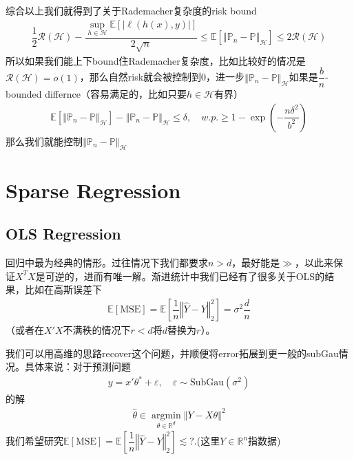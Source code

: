 \documentclass[11pt,a4paper]{ctexart}
\numberwithin{equation}{section}%
\begin{document}
综合以上我们就得到了关于Rademacher复杂度的risk bound
\begin{align*}
    \dfrac{ 1 }{ 2 } \mathcal{R}(\mathcal{H})-\dfrac{ \mathop{ \sup  }\limits_{h\in\mathcal{H}}\mathbb{E}\left[ \left\vert\ell(h(x),y) \right\vert  \right] }{ 2\sqrt{n} } \leq \mathbb{E}\left[ \left\Vert \mathbb{P}_n-\mathbb{P} \right\Vert _\mathcal{H} \right] \leq 2 \mathcal{R}(\mathcal{H}) 
\end{align*}
所以如果我们能上下bound住Rademacher复杂度，比如比较好的情况是$ \mathcal{R}(\mathcal{H}) = o(1)$，那么自然risk就会被控制到0，进一步$ \left\Vert \mathbb{P}_n-\mathbb{P} \right\Vert _\mathcal{H}  $如果是$ \dfrac{ b }{ n }  $-bounded differnce（容易满足的，比如只要$ h\in\mathcal{H} $有界）
\begin{align*}
    \mathbb{E}\left[ \left\Vert \mathbb{P}_n-\mathbb{P} \right\Vert _\mathcal{H} \right] -  \left\Vert \mathbb{P}_n-\mathbb{P} \right\Vert _\mathcal{H} \leq \delta ,\quad w.p. \geq 1-\exp\left( -\dfrac{ n \delta^2 }{ b^2 } \right)
\end{align*}
那么我们就能控制$ \left\Vert \mathbb{P}_n-\mathbb{P} \right\Vert _{\mathcal{H}} $







\section{Sparse Regression}

\subsection{OLS Regression}
回归中最为经典的情形。过往情况下我们都要求$ n>d $，最好能是$ \gg $，以此来保证$ X^TX $是可逆的，进而有唯一解。渐进统计中我们已经有了很多关于OLS的结果，比如在高斯误差下
\begin{align*}
    \mathbb{E}\left[ \mathrm{MSE}   \right] = \mathbb{E}\left[ \dfrac{ 1 }{ n }\left\Vert \hat{Y}-Y \right\Vert _2^2  \right]  = \sigma ^2 \dfrac{ d }{ n }
\end{align*}
（或者在$ X'X $不满秩的情况下$ r<d $将$ d $替换为$ r $）。

我们可以用高维的思路recover这个问题，并顺便将error拓展到更一般的subGau情况。具体来说：对于预测问题
\begin{align*}
    y=x'\theta ^*+\varepsilon,\quad \varepsilon\sim \mathrm{SubGau}(\sigma ^2) 
\end{align*}
的解
\begin{align*}
     \hat{\theta } \in \mathop{ \arg\min  }\limits_{\theta \in \mathbb{R}^d} \left\Vert Y-X\theta  \right\Vert ^2
\end{align*}
我们希望研究$ \mathbb{E}\left[ \mathrm{MSE}   \right] = \mathbb{E}\left[ \dfrac{ 1 }{ n } \left\Vert \hat{Y}-Y \right\Vert _2^2 \right]  \lesssim ? $.(这里$ Y\in \mathbb{R}^n $指数据)
\end{document}
